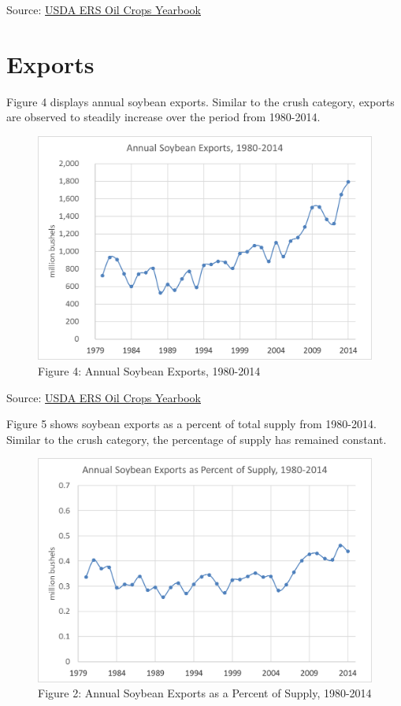 \documentclass[]{book}
\theoremstyle{definition}
\theoremstyle{definition}
\theoremstyle{remark}
\begin{document}
Source:
\href{http://www.ers.usda.gov/data-products/oil-crops-yearbook.aspx}{USDA
ERS Oil Crops Yearbook}

\section{Exports}\label{exports-2}

Figure 4 displays annual soybean exports. Similar to the crush category,
exports are observed to steadily increase over the period from
1980-2014.

\begin{figure}[htbp]
\centering
\includegraphics{Excel-files/ForecastingUseSoy-OilCropsYearbook_files/image001.png}
\caption{Figure 4: Annual Soybean Exports, 1980-2014}
\end{figure}

Source:
\href{http://www.ers.usda.gov/data-products/oil-crops-yearbook.aspx}{USDA
ERS Oil Crops Yearbook}

Figure 5 shows soybean exports as a percent of total supply from
1980-2014. Similar to the crush category, the percentage of supply has
remained constant.

\begin{figure}[htbp]
\centering
\includegraphics{Excel-files/ForecastingUseSoy-OilCropsYearbook_files/image009.png}
\caption{Figure 2: Annual Soybean Exports as a Percent of Supply,
1980-2014}
\end{figure}
\end{document}

